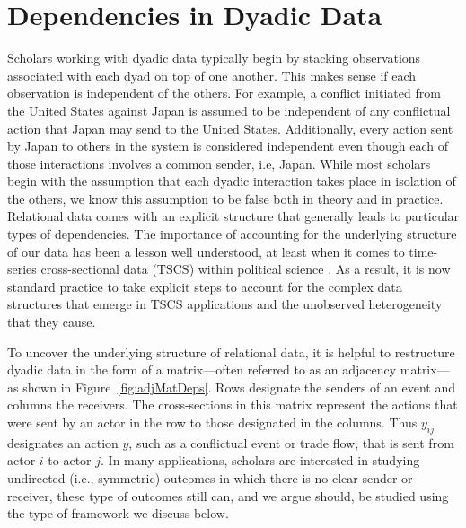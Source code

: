 \section{\textbf{Dependencies in Dyadic Data}}

Scholars working with dyadic data typically begin by stacking observations associated with each dyad on top of one another. This makes sense if each observation is independent of the others. For example, a conflict initiated from the United States against Japan is assumed to be independent of any conflictual action that Japan may send to the United States. Additionally, every action sent by Japan to others in the system is considered independent even though each of those interactions involves a common sender, i.e, Japan. While most scholars begin with the assumption that each dyadic interaction takes place in isolation of the others, we know this assumption to be false both in theory and in practice. Relational data comes with an explicit structure that generally leads to particular types of dependencies. The importance of accounting for the underlying structure of our data has been a lesson well understood, at least when it comes to time-series cross-sectional data (TSCS) within political science \citep{beck:katz:1995,beck:etal:1998}. As a result, it is now standard practice to take explicit steps to account for the complex data structures that emerge in TSCS applications and the unobserved heterogeneity that they cause. 

To uncover the underlying structure of relational data, it is helpful to restructure dyadic data in the form of a matrix---often referred to as an adjacency matrix---as shown in Figure~\ref{fig:adjMatDeps}. Rows designate the senders of an event and columns the receivers. The cross-sections in this matrix represent the actions that were sent by an actor in the row to those designated in the columns. Thus $y_{ij}$ designates an action $y$, such as a conflictual event or trade flow, that is sent from actor $i$ to actor $j$. In many applications, scholars are interested in studying undirected (i.e., symmetric) outcomes in which there is no clear sender or receiver, these type of outcomes still can, and we argue should, be studied using the type of framework we discuss below.


